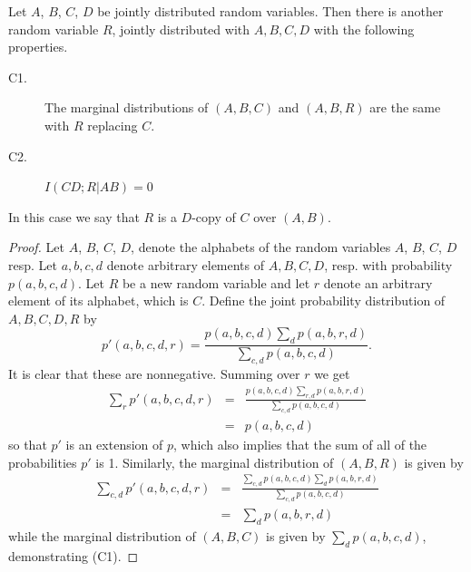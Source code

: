 \documentclass[10pt,journal]{IEEEtran}
\begin{document}
\begin{lemma}\label{copyLemma}
Let $A$, $B$, $C$, $D$ be jointly distributed random variables.  Then there is another random variable
$R$, jointly distributed with $A,B,C,D$  with the following properties.

\begin{description}
\item [C1.] The marginal distributions of $(A,B,C)$ and $(A,B,R)$ are the same with $R$ replacing $C$.
\item [C2.] $I(CD;R|AB)=0$
\end{description}
In this case we say that $R$ is a $D$-copy of $C$ over $(A,B)$.
\end{lemma}
\begin{proof}
Let $A$, $B$, $C$, $D$, denote the alphabets of the random variables $A$, $B$, $C$, $D$ resp.
Let $a,b,c,d$ denote arbitrary elements of $A,B,C,D$, resp.  with probability $p(a,b,c,d)$.
Let $R$ be a new random variable and let $r$ denote an arbitrary element of its alphabet, which is $C$.
Define the joint probability distribution of $A,B,C,D,R$ by
$$
p'(a,b,c,d,r) = \frac{p(a,b,c,d)\sum_d p(a,b,r,d)}{\sum_{c,d}p(a,b,c,d)}.
$$
It is clear that these are nonnegative.
Summing over $r$ we get
\begin{eqnarray*}
\sum_r  p'(a,b,c,d,r) &=& \frac{p(a,b,c,d)\sum_{r,d} p(a,b,r,d)}{\sum_{c,d}p(a,b,c,d)}\\
&=& p(a,b,c,d)
\end{eqnarray*}
so that $p'$ is an extension of $p$, which also implies that the sum of all of the probabilities $p'$ is 1.
Similarly, the marginal distribution of $(A,B,R)$ is given by
\begin{eqnarray*}
\sum_{c,d}  p'(a,b,c,d,r) &=& \frac{\sum_{c,d} p(a,b,c,d)\sum_{d} p(a,b,r,d)}{\sum_{c,d}p(a,b,c,d)}\\
&=& \sum_{d} p(a,b,r,d)
\end{eqnarray*}
while the marginal distribution of $(A,B,C)$ is given by $\sum_{d} p(a,b,c,d)$, demonstrating (C1).


\end{proof}
\end{document}
